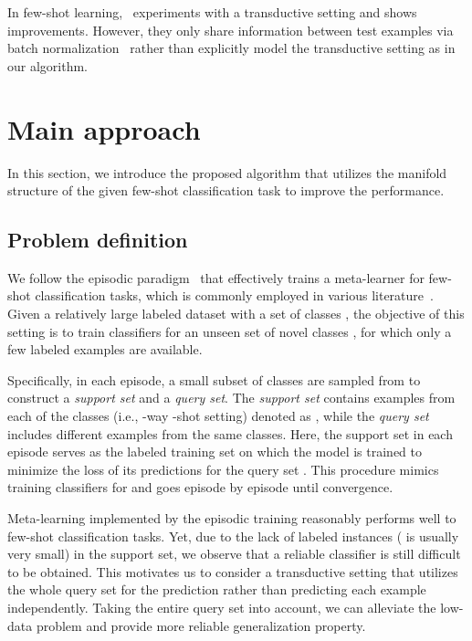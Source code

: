 \documentclass{article} \usepackage{iclr2019_conference,times}
\begin{document}
In few-shot learning, \cite{first-order}~experiments with a transductive setting and shows improvements. However, they only share information between test examples via batch normalization~\citep{bn} rather than explicitly model the transductive setting as in our algorithm. 



\section{Main approach}

In this section, we introduce the proposed algorithm that utilizes the manifold
structure of the given few-shot classification task to improve the performance.

\subsection{Problem definition}

We follow the episodic paradigm~\citep{matching} that effectively trains a meta-learner for 
few-shot classification tasks, which is commonly employed in various literature~\citep{prototypical,maml,first-order,compare,snail}. 
Given a relatively large labeled dataset with a set of classes ,
the objective of this setting is to train classifiers for an unseen set of novel classes , for which only a few labeled examples are available. 



Specifically, in each episode, a small subset of  classes are sampled from  to construct a \textit{support set} and a \textit{query set}. The \textit{support set} contains  examples from each of the  classes (i.e., -way -shot setting) denoted as , while the \textit{query set}  includes different examples from the same  classes. Here, the support set   in each episode serves as the labeled training set on which the model is trained to minimize the loss of its predictions for the query set . This procedure mimics training classifiers for  and goes episode by episode until convergence. 

Meta-learning implemented by the episodic training reasonably performs well to
few-shot classification tasks. Yet, due to the lack of labeled instances ( is usually very small)
in the support set, we observe that a reliable classifier is still difficult to be obtained. 
This motivates us 
to consider a transductive setting that utilizes the whole query set for the prediction rather than predicting each example independently. Taking the entire query set into account, we can alleviate the low-data problem and provide more reliable generalization property.
\end{document}
